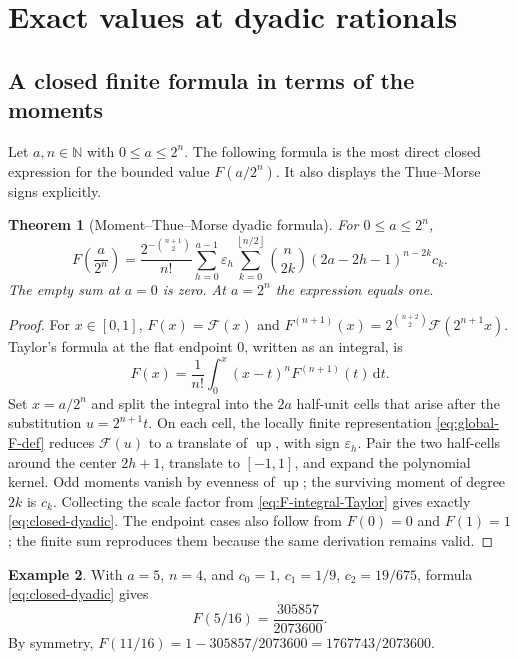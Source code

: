 \documentclass[11pt]{article}
\numberwithin{equation}{section}
\newtheorem{theorem}{Theorem}[section]
\theoremstyle{definition}
\newtheorem{example}[theorem]{Example}
\theoremstyle{remark}
\newcommand{\N}{\mathbb N}
\newcommand{\GF}{\mathcal F}
\newcommand{\upf}{\operatorname{up}}
\newcommand{\eps}{\varepsilon}
\newcommand{\dd}{\,\mathrm d}
\newcommand{\floor}[1]{\left\lfloor#1\right\rfloor}
\begin{document}
\section{Exact values at dyadic rationals}\label{sec:dyadic}

\subsection{A closed finite formula in terms of the moments}

Let $a,n\in\N$ with $0\le a\le2^n$.  The following formula is the most direct closed expression for the bounded value $F(a/2^n)$.  It also displays the Thue--Morse signs explicitly.

\begin{theorem}[Moment--Thue--Morse dyadic formula]\label{thm:closed-dyadic}
For $0\le a\le2^n$,
\begin{equation}\label{eq:closed-dyadic}
\boxed{
 F\!\left(\frac{a}{2^n}\right)
 =\frac{2^{-\binom{n+1}{2}}}{n!}
 \sum_{h=0}^{a-1}\eps_h
 \sum_{k=0}^{\floor{n/2}}
 \binom n{2k}(2a-2h-1)^{n-2k}c_k .}
\end{equation}
The empty sum at $a=0$ is zero.  At $a=2^n$ the expression equals one.
\end{theorem}

\begin{proof}
For $x\in[0,1]$, $F(x)=\GF(x)$ and $F^{(n+1)}(x)=2^{\binom{n+2}{2}}\GF(2^{n+1}x)$.  Taylor's formula at the flat endpoint $0$, written as an integral, is
\begin{equation}\label{eq:F-integral-Taylor}
 F(x)=\frac{1}{n!}\int_0^x(x-t)^nF^{(n+1)}(t)\dd t.
\end{equation}
Set $x=a/2^n$ and split the integral into the $2a$ half-unit cells that arise after the substitution $u=2^{n+1}t$.  On each cell, the locally finite representation \eqref{eq:global-F-def} reduces $\GF(u)$ to a translate of $\upf$, with sign $\eps_h$.  Pair the two half-cells around the center $2h+1$, translate to $[-1,1]$, and expand the polynomial kernel.  Odd moments vanish by evenness of $\upf$; the surviving moment of degree $2k$ is $c_k$.  Collecting the scale factor from \eqref{eq:F-integral-Taylor} gives exactly \eqref{eq:closed-dyadic}.  The endpoint cases also follow from $F(0)=0$ and $F(1)=1$; the finite sum reproduces them because the same derivation remains valid.
\end{proof}

\begin{example}\label{ex:five-sixteenths}
With $a=5$, $n=4$, and $c_0=1$, $c_1=1/9$, $c_2=19/675$, formula \eqref{eq:closed-dyadic} gives
\begin{equation}\label{eq:five-sixteenths}
 F(5/16)=\frac{305857}{2073600}.
\end{equation}
By symmetry,
$F(11/16)=1-305857/2073600=1767743/2073600$.
\end{example}
\end{document}
